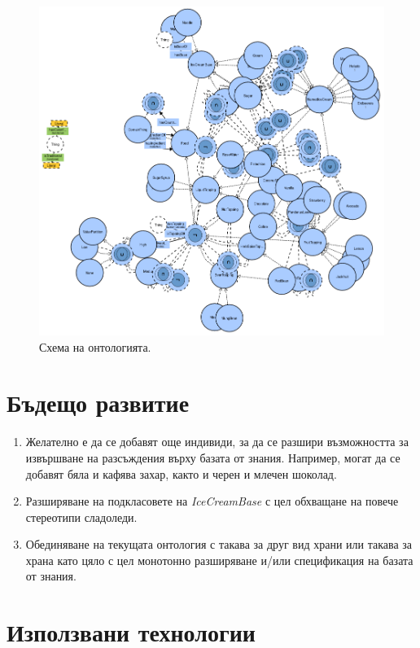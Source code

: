 \documentclass[12pt]{article}
\begin{document}
        \begin{figure}
        \centering
            \includegraphics[scale=0.5]{./images/viz1.png}
            \caption{Схема на онтологията.}
            \label{fig:viz1}
        \end{figure}


\section{Бъдещо развитие}

\begin{enumerate}
    \item Желателно е да се добавят още индивиди, за да се разшири възможността за извършване на разсъждения върху базата от знания. Например, могат да се добавят бяла и кафява захар, както и черен и млечен шоколад.
    \item Разширяване на подкласовете на \textit{IceCreamBase} с цел обхващане на повече стереотипи сладоледи.
    \item Обединяване на текущата онтология с такава за друг вид храни или такава за храна като цяло с цел монотонно разширяване и/или спецификация на базата от знания.
\end{enumerate}


\section{Използвани технологии}
\end{document}
